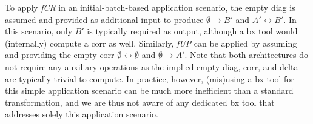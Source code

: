 To apply \emph{fCR} in an initial-batch-based application scenario, the empty diag is assumed and provided as additional input to produce $\emptyset \rightarrow B'$ and $A' \leftrightarrow B'$.
In this scenario, only $B'$ is typically required as output, although a bx tool would (internally) compute a corr as well.
%
Similarly, \emph{fUP} can be applied by assuming and providing the empty corr $\emptyset \leftrightarrow \emptyset$ and $\emptyset \rightarrow A'$.
%
Note that both architectures do not require any auxiliary operations as the implied empty diag, corr, and delta are typically trivial to compute.
In practice, however, (mis)using a bx tool for this simple application scenario can be much more inefficient than a standard transformation, and we are thus not aware of any dedicated bx tool that addresses solely this application scenario. 

